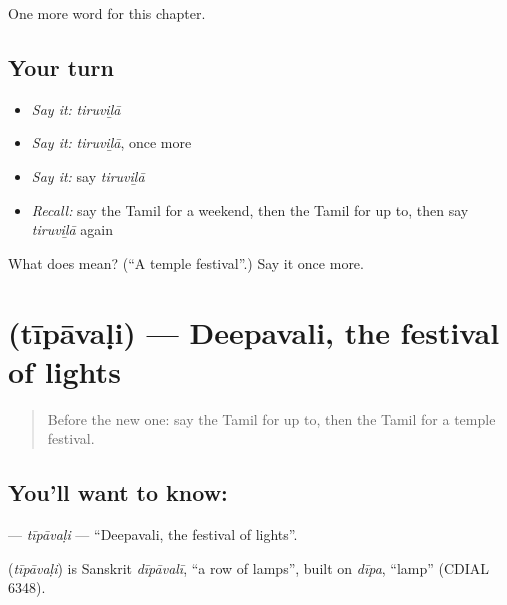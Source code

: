 \begin{grammarlens}[title={What you've built}]
One more word for this chapter.
\end{grammarlens}

\subsection*{Your turn}
\begin{itemize}
\raggedright
  \item \emph{Say it:} \emph{tiruviḻā}
  \item \emph{Say it:} \emph{tiruviḻā}, once more
  \item \emph{Say it:} say \emph{tiruviḻā}
  \item \emph{Recall:} say the Tamil for a weekend, then the Tamil for up to, then say \emph{tiruviḻā} again
\end{itemize}

\begin{tcolorbox}[breakable,colback=teal!4,colframe=teal!35!black,title={Before you move on}]
What does  mean? (\textquotedblleft{}A temple festival\textquotedblright{}.) Say it once more.
\end{tcolorbox}
\section[\texorpdfstring{\ta{தீபாவளி} (tīpāvaḷi)}{தீபாவளி (tīpāvaḷi)}]{ (tīpāvaḷi) — Deepavali, the festival of lights}

\label{lesson:TA-C202-tipavali}



\begin{quote}
Before the new one: say the Tamil for up to, then the Tamil for a temple festival.
\end{quote}

\subsection*{You'll want to know: }
\textbf{} — \emph{tīpāvaḷi} — \textquotedblleft{}Deepavali, the festival of lights\textquotedblright{}.

\begin{cousinweb}
\textbf{} (\emph{tīpāvaḷi}) is Sanskrit \emph{dīpāvalī}, \textquotedblleft{}a row of lamps\textquotedblright{}, built on \emph{dīpa}, \textquotedblleft{}lamp\textquotedblright{} (CDIAL 6348).
\end{cousinweb}

